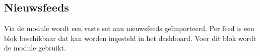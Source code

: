 \subsection{Nieuwsfeeds}\label{nieuwsfeeds}

Via de  module wordt een vaste set aan nieuwsfeeds ge\"{i}mporteerd. Per feed is een blok beschikbaar dat kan worden ingesteld in het dashboard. Voor dit blok wordt de  module gebruikt.
